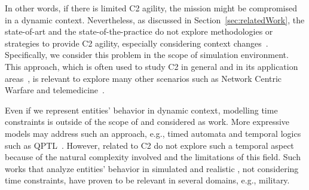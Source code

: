 In other words, if there is limited C2 agility, the mission might be compromised in a dynamic context. Nevertheless, as discussed in Section~\ref{sec:relatedWork}, the state-of-art and the state-of-the-practice do not explore methodologies or strategies to provide C2 agility, especially considering context changes~\citep{Alberts2006}. 
Specifically, we consider this problem in the scope of simulation environment. This approach, which is often used to study C2 in general and in its application areas~\citep{FRANCE2014}, is relevant to explore many other scenarios such as Network Centric Warfare and telemedicine~\citep{telemedicine01, FRANCE2014, Power01}.

Even if we  represent entities’ behavior in dynamic context, modelling time constraints is outside of the scope of  and considered as  work. More expressive models may address such an approach, e.g., timed automata and temporal logics such as QPTL~\citep{QPTL01}. However,  related to C2 do not explore such a temporal aspect because of the natural complexity involved and the limitations of this field. Such works that analyze entities’ behavior in simulated and realistic , not considering time constraints, have proven to be relevant in several domains, e.g., military.





